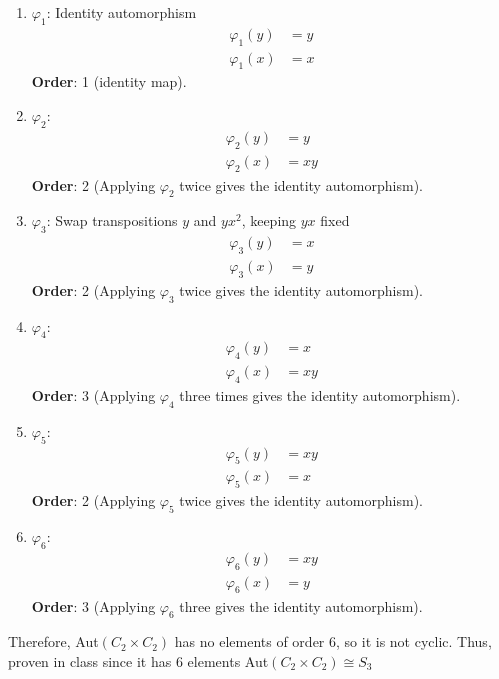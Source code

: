 \documentclass[12pt, letterpaper]{article}
\theoremstyle{definition}
\begin{document}
\begin{enumerate}
    \item \(\varphi_1\): Identity automorphism
    \begin{align*}
    \varphi_1(y) &= y \\
    \varphi_1(x) &= x
    \end{align*}
    \textbf{Order}: 1 (identity map).
    
    \item \(\varphi_2\):
    \begin{align*}
    \varphi_2(y) &= y \\
    \varphi_2(x) &= xy
    \end{align*}
    \textbf{Order}: 2 (Applying \( \varphi_2 \) twice gives the identity automorphism).
    
    \item \(\varphi_3\): Swap transpositions \( y \) and \( yx^2 \), keeping \( yx \) fixed
    \begin{align*}
    \varphi_3(y) &= x \\
    \varphi_3(x) &= y
    \end{align*}
    \textbf{Order}: 2 (Applying \( \varphi_3 \) twice gives the identity automorphism).
    
    \item \(\varphi_4\):
    \begin{align*}
    \varphi_4(y) &= x \\
    \varphi_4(x) &= xy
    \end{align*}
    \textbf{Order}: 3 (Applying \( \varphi_4 \) three times gives the identity automorphism).
    
    \item \(\varphi_5\):
    \begin{align*}
    \varphi_5(y) &= xy \\
    \varphi_5(x) &= x
    \end{align*}
    \textbf{Order}: 2 (Applying \( \varphi_5 \) twice gives the identity automorphism).
    
    \item \(\varphi_6\):
    \begin{align*}
    \varphi_6(y) &= xy \\
    \varphi_6(x) &= y
    \end{align*}
    \textbf{Order}: 3 (Applying \( \varphi_6 \) three gives the identity automorphism).
\end{enumerate}
Therefore, Aut$(C_2\times C_2)$ has no elements of order 6, so it is not cyclic. Thus, proven in class since it has 6 elements Aut$(C_2 \times C_2) \cong S_3$
\end{document}
